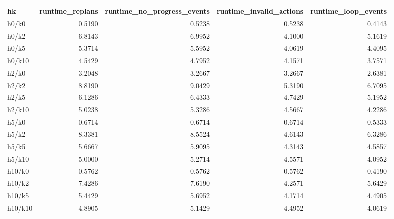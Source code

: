 \begin{tabular}{lrrrr}
\toprule
hk & runtime_replans & runtime_no_progress_events & runtime_invalid_actions & runtime_loop_events \\
\midrule
h0/k0 & 0.5190 & 0.5238 & 0.5238 & 0.4143 \\
h0/k2 & 6.8143 & 6.9952 & 4.1000 & 5.1619 \\
h0/k5 & 5.3714 & 5.5952 & 4.0619 & 4.4095 \\
h0/k10 & 4.5429 & 4.7952 & 4.1571 & 3.7571 \\
h2/k0 & 3.2048 & 3.2667 & 3.2667 & 2.6381 \\
h2/k2 & 8.8190 & 9.0429 & 5.3190 & 6.7095 \\
h2/k5 & 6.1286 & 6.4333 & 4.7429 & 5.1952 \\
h2/k10 & 5.0238 & 5.3286 & 4.5667 & 4.2286 \\
h5/k0 & 0.6714 & 0.6714 & 0.6714 & 0.5333 \\
h5/k2 & 8.3381 & 8.5524 & 4.6143 & 6.3286 \\
h5/k5 & 5.6667 & 5.9095 & 4.3143 & 4.5857 \\
h5/k10 & 5.0000 & 5.2714 & 4.5571 & 4.0952 \\
h10/k0 & 0.5762 & 0.5762 & 0.5762 & 0.4190 \\
h10/k2 & 7.4286 & 7.6190 & 4.2571 & 5.6429 \\
h10/k5 & 5.4429 & 5.6952 & 4.1714 & 4.4905 \\
h10/k10 & 4.8905 & 5.1429 & 4.4952 & 4.0619 \\
\bottomrule
\end{tabular}
